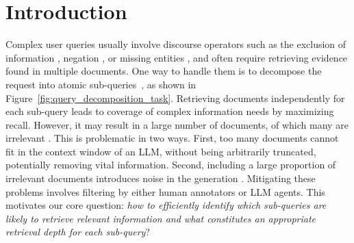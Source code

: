 \section{Introduction}
\label{sec:introduction}


Complex user queries usually involve discourse operators such as the exclusion of information \cite{excluir}, negation \cite{petcu2025comprehensivetaxonomynegationnlp, nevir, repro_nevir}, or missing entities \cite{reasoning_missing_entities, tip_of_the_tongue}, and often require retrieving evidence found in multiple documents.
One way to handle them is to decompose the request into atomic sub-queries~\cite{khot2023decomposedpromptingmodularapproach}, as shown in Figure~\ref{fig:query_decomposition_task}. %
Retrieving documents independently for each sub-query leads to coverage of complex information needs by maximizing recall. However, it may result in a large number of documents, of which many are irrelevant \cite{kim2025NotInformative}. This is problematic in two ways. 
First, too many documents cannot fit in the context window of an LLM, without being arbitrarily truncated, potentially removing vital information.
Second, including a large proportion of irrelevant documents introduces noise in the generation \cite{jin2024longcontextllmsmeetrag}. 
Mitigating these problems involves filtering by either human annotators or LLM agents. This motivates our core question: \emph{how to efficiently identify which sub-queries are likely to retrieve relevant information and what constitutes an appropriate retrieval depth for each sub-query}?

